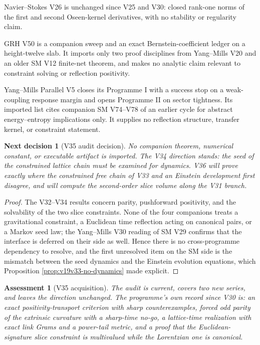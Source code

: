 \documentclass[11pt]{article}
\newtheorem{decision}[theorem]{Next decision}
\newtheorem{assessment}[theorem]{Assessment}
\theoremstyle{remark}
\begin{document}
Navier--Stokes V26 is unchanged since V25 and V30: closed rank-one norms
of the first and second Oseen-kernel derivatives, with no stability or
regularity claim.

GRH V50 is a companion sweep and an exact Bernstein-coefficient ledger on
a height-twelve slab.  It imports only two proof disciplines from
Yang--Mills V20 and an older SM V12 finite-net theorem, and makes no
analytic claim relevant to constraint solving or reflection positivity.

Yang--Mills Parallel V5 closes its Programme I with a success stop on a
weak-coupling response margin and opens Programme II on sector tightness.
Its imported list cites companion SM V74--V78 of an earlier cycle for
abstract energy--entropy implications only.  It supplies no reflection
structure, transfer kernel, or constraint statement.

\begin{decision}[V35 audit decision]
\label{dec:v19v35-audit}
No companion theorem, numerical constant, or executable artifact is
imported.  The V34 direction stands: the seed of the constrained lattice
chain must be examined for dynamics.  V36 will prove exactly where the
constrained free chain of V33 and an Einstein development first
disagree, and will compute the second-order slice volume along the V31
branch.
\end{decision}

\begin{proof}
The V32--V34 results concern parity, pushforward positivity, and the
solvability of the two slice constraints.  None of the four companions
treats a gravitational constraint, a Euclidean time reflection acting on
canonical pairs, or a Markov seed law; the Yang--Mills V30 reading of SM
V29 confirms that the interface is deferred on their side as well.
Hence there is no cross-programme dependency to resolve, and the first
unresolved item on the SM side is the mismatch between the seed
dynamics and the Einstein evolution equations, which Proposition
\ref{prop:v19v33-no-dynamics} made explicit.
\end{proof}

\begin{assessment}[V35 acquisition]
\label{ass:v19v35}
The audit is current, covers two new series, and leaves the direction
unchanged.  The programme's own record since V30 is: an exact
positivity-transport criterion with sharp counterexamples, forced odd
parity of the extrinsic curvature with a sharp-time no-go, a lattice-time
realization with exact link Grams and a power-tail metric, and a proof
that the Euclidean-signature slice constraint is multivalued while the
Lorentzian one is canonical.
\end{assessment}
\end{document}
